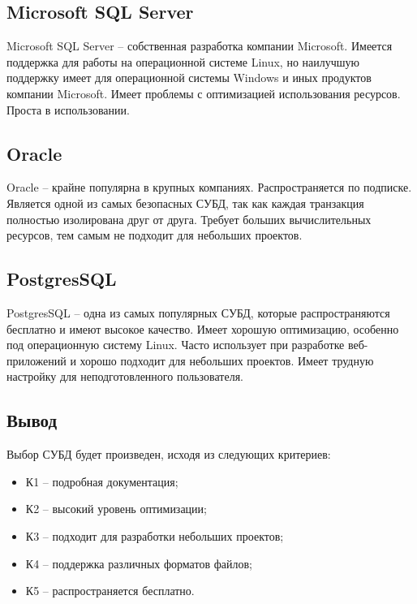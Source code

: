 \subsection{Microsoft SQL Server}

Microsoft SQL Server \cite{sqlserver} -- собственная разработка компании Microsoft. Имеется поддержка для работы на операционной системе Linux, но наилучшую поддержку имеет для операционной системы Windows и иных продуктов компании Microsoft. Имеет проблемы с оптимизацией использования ресурсов. Проста в использовании.

\subsection{Oracle}

Oracle \cite{oracle} -- крайне популярна в крупных компаниях. Распространяется по подписке. Является одной из самых безопасных СУБД, так как каждая транзакция полностью изолирована друг от друга. Требует больших вычислительных ресурсов, тем самым не подходит для небольших проектов.

\subsection{PostgresSQL}

PostgresSQL \cite{postgres} -- одна из самых популярных СУБД, которые распространяются бесплатно и имеют высокое качество. Имеет хорошую оптимизацию, особенно под операционную систему Linux. Часто использует при разработке веб-приложений и хорошо подходит для небольших проектов. Имеет трудную настройку для неподготовленного пользователя.

\subsection{Вывод}

Выбор СУБД будет произведен, исходя из следующих критериев:

\begin{itemize}
    \item К1 -- подробная документация;
    \item К2 -- высокий уровень оптимизации;
    \item К3 -- подходит для разработки небольших проектов;
    \item К4 -- поддержка различных форматов файлов;
    \item К5 -- распространяется бесплатно.
\end{itemize}

